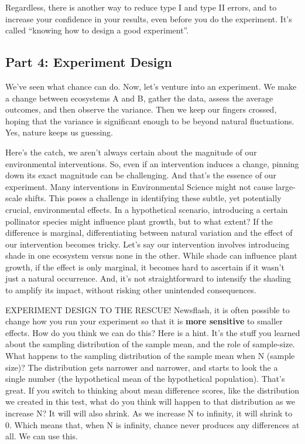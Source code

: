 \documentclass[
  letterpaper,
  DIV=11,
  numbers=noendperiod]{scrreprt}
\begin{document}
Regardless, there is another way to reduce type I and type II errors,
and to increase your confidence in your results, even before you do the
experiment. It's called ``knowing how to design a good experiment''.

\subsection{Part 4: Experiment Design}\label{part-4-experiment-design}

We've seen what chance can do. Now, let's venture into an experiment. We
make a change between ecosystems A and B, gather the data, assess the
average outcomes, and then observe the variance. Then we keep our
fingers crossed, hoping that the variance is significant enough to be
beyond natural fluctuations. Yes, nature keeps us guessing.

Here's the catch, we aren't always certain about the magnitude of our
environmental interventions. So, even if an intervention induces a
change, pinning down its exact magnitude can be challenging. And that's
the essence of our experiment. Many interventions in Environmental
Science might not cause large-scale shifts. This poses a challenge in
identifying these subtle, yet potentially crucial, environmental
effects. In a hypothetical scenario, introducing a certain pollinator
species might influence plant growth, but to what extent? If the
difference is marginal, differentiating between natural variation and
the effect of our intervention becomes tricky. Let's say our
intervention involves introducing shade in one ecosystem versus none in
the other. While shade can influence plant growth, if the effect is only
marginal, it becomes hard to ascertain if it wasn't just a natural
occurrence. And, it's not straightforward to intensify the shading to
amplify its impact, without risking other unintended consequences.

EXPERIMENT DESIGN TO THE RESCUE! Newsflash, it is often possible to
change how you run your experiment so that it is \textbf{more sensitive}
to smaller effects. How do you think we can do this? Here is a hint.
It's the stuff you learned about the sampling distribution of the sample
mean, and the role of sample-size. What happens to the sampling
distribution of the sample mean when N (sample size)? The distribution
gets narrower and narrower, and starts to look the a single number (the
hypothetical mean of the hypothetical population). That's great. If you
switch to thinking about mean difference scores, like the distribution
we created in this test, what do you think will happen to that
distribution as we increase N? It will will also shrink. As we increase
N to infinity, it will shrink to 0. Which means that, when N is
infinity, chance never produces any differences at all. We can use this.
\end{document}
